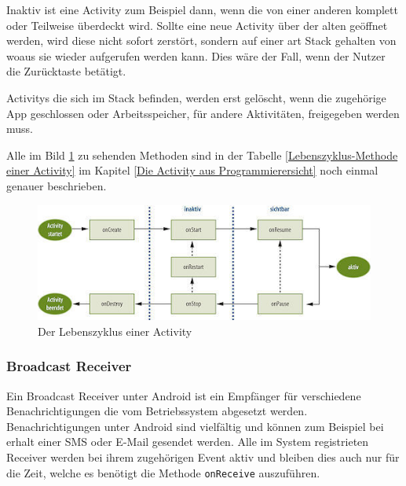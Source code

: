 Inaktiv ist eine Activity zum Beispiel dann, wenn die von einer anderen komplett oder Teilweise \"uberdeckt wird. Sollte eine neue Activity \"uber der alten ge\"offnet werden, wird diese nicht sofort zerst\"ort, sondern auf einer art Stack gehalten von woaus sie wieder aufgerufen werden kann. Dies w\"are der Fall, wenn der Nutzer die Zur\"ucktaste bet\"atigt.

Activitys die sich im Stack befinden, werden erst gel\"oscht, wenn die zugeh\"orige App geschlossen oder Arbeitsspeicher, f\"ur andere Aktivit\"aten, freigegeben werden muss. 

Alle im Bild \ref{ActivityLebenszyklus} zu sehenden Methoden sind in der Tabelle \ref{Lebenszyklus-Methode einer Activity} im Kapitel \ref{Die Activity aus Programmierersicht} noch einmal genauer beschrieben.

\begin{figure}[!ht]
\centering
\includegraphics[width=14cm]{Bilder/ActivityLifecycle}
\caption{Der Lebenszyklus einer Activity \cite{ActivityLifecycle}}
\label{ActivityLebenszyklus}
\centering
\end{figure}
\FloatBarrier


\subsubsection{Broadcast Receiver} \label{Broadcast Receiver aus Nutzersicht}
Ein Broadcast Receiver unter Android ist ein Empf\"anger f\"ur verschiedene Benachrichtigungen die vom Betriebssystem abgesetzt werden. Benachrichtigungen unter Android sind vielf\"altig und k\"onnen zum Beispiel bei erhalt einer SMS oder E-Mail gesendet werden. Alle im System registrieten Receiver werden bei ihrem zugeh\"origen Event aktiv und bleiben dies auch nur f\"ur die Zeit, welche es ben\"otigt die Methode \texttt{onReceive} auszuf\"uhren.

